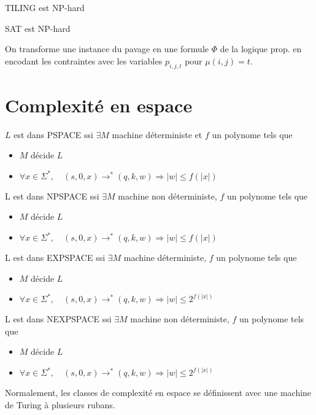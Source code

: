 \documentclass[10pt,a4paper]{article}
\begin{document}
\begin{thm}
 TILING est NP-hard
\end{thm}

\begin{thm}
  SAT est NP-hard
\end{thm}


\begin{dem}
 On transforme une instance du pavage en une formule $\Phi$ de la logique prop. en encodant les contraintes avec les variables $p_{i,j,t}$ pour $\mu(i,j) = t$.
\end{dem}



\section{Complexité en espace}
\begin{definition}{}$L$ est dans PSPACE ssi $\exists M$ machine déterministe et $f$ un polynome tels que \begin{itemize}
\item $M$ décide $L$
\item $\forall x \in \Sigma^*, \quad (s,0,x) \rightarrow^* (q, k, w) \Longrightarrow  | w |  \leq f( | x | )$
\end{itemize}\end{definition}
\begin{definition}{}L est dans NPSPACE ssi $\exists M$ machine non déterministe, $f$ un polynome tels que \begin{itemize}
\item $M$ décide $L$
\item $\forall x \in \Sigma^*, \quad (s,0,x) \rightarrow^* (q, k, w) \Longrightarrow  | w |  \leq f( | x | )$
\end{itemize}\end{definition}
\begin{definition}{}L est dans EXPSPACE ssi $\exists M$ machine déterministe, $f$ un polynome tels que \begin{itemize}
\item $M$ décide $L$
\item $\forall x \in \Sigma^*, \quad (s,0,x) \rightarrow^* (q, k, w) \Longrightarrow  | w |  \leq 2^{f( | x | )}$
\end{itemize}\end{definition}
\begin{definition}{}L est dans NEXPSPACE ssi $\exists M$ machine non déterministe, $f$ un polynome tels que \begin{itemize}
\item $M$ décide $L$
\item $\forall x \in \Sigma^*,  \quad (s,0,x) \rightarrow^* (q, k, w) \Longrightarrow  | w |  \leq 2^{f( | x | )}$
\end{itemize}\end{definition}
\begin{rem}
 Normalement, les classes de complexité en espace se définissent avec une machine de Turing à plusieurs rubans.
\end{rem}
\end{document}
